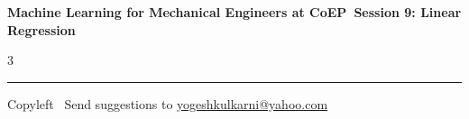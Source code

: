 \documentclass[8pt,landscape]{article}
\begin{document}
\footnotesize

\begin{center}
\Large{\textbf{Machine Learning for Mechanical Engineers at CoEP\ Session 9: Linear Regression}}
\end{center}

\begin{multicols}{3}

\end{multicols}

\rule{\linewidth}{0.25pt}
\scriptsize
Copyleft \textcopyleft\  Send suggestions to
\href{http://www.yogeshkulkarni.com}{yogeshkulkarni@yahoo.com}
\end{document}

